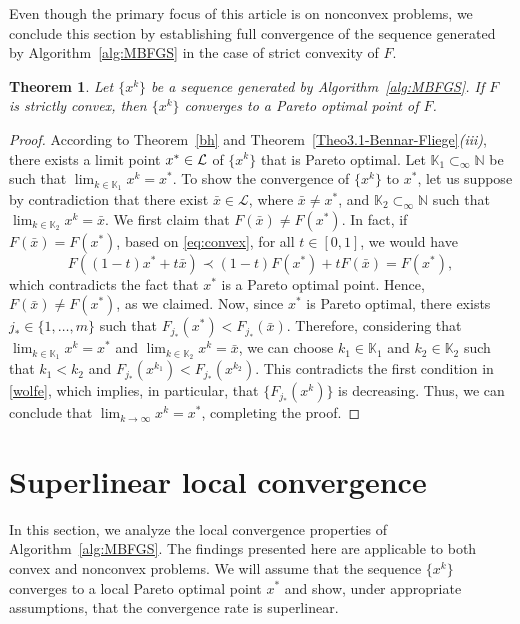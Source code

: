 \documentclass[11pt]{article}
\newtheorem{theorem}{Theorem}[section]
\numberwithin{assumption}{section}
\newcommand{\N}{\mathbb{N}}
\newcommand{\K}{\mathbb{K}}
\newcommand{\Ls}{{\cal{L}}}
\newcommand{\xs}{x^{\ast}}
\newcommand{\subsetinf}{\displaystyle\mathop{\subset}_{\infty}}
\begin{document}
Even though the primary focus of this article is on nonconvex problems, we conclude this section by establishing full convergence of the sequence generated by Algorithm~\ref{alg:MBFGS} in the case of strict convexity of $F$.

\begin{theorem}
Let $\{x^k\}$ be a sequence generated by Algorithm~\ref{alg:MBFGS}. If $F$ is strictly convex, then $\{x^k\}$ converges to a Pareto optimal point of $F$.
\end{theorem}
\begin{proof}
According to Theorem~\ref{bh} and Theorem~\ref{Theo3.1-Bennar-Fliege}{\it (iii)}, there exists a limit point $\xs\in\Ls$ of $\{x^k\}$ that is Pareto optimal.
Let $\K_1\subsetinf \N$ be such that  $\lim_{k\in \K_1}x^k=\xs$.
To show the convergence of $\{x^k\}$ to $\xs$, let us suppose by contradiction that there exist $\bar{x}\in\mathcal{L}$, where $\bar{x}\neq x^{\ast}$, and $\K_2\subsetinf \N$ such that $\lim_{k\in \K_2}x^k=\bar{x}$.
We first claim that $F(\bar{x})\neq F(x^{\ast})$. In fact, if $F(\bar{x})= F(x^{\ast})$, based on \eqref{eq:convex}, for all $t\in[0,1]$, we would have
\[F((1-t)x^{\ast}+t\bar{x})\prec (1-t)F(x^{\ast})+tF(\bar{x})=F(x^{\ast}),\]
which contradicts the fact that $x^{\ast}$ is a Pareto optimal point. Hence, $F(\bar{x})\neq F(x^{\ast})$, as we claimed.
Now, since $x^{\ast}$ is Pareto optimal, there exists $j_\ast\in\{1,\ldots,m\}$ such that $F_{j_\ast}(x^{\ast})<F_{j_\ast}(\bar{x})$. Therefore, considering that $\lim_{k\in \K_1}x^k=x^{\ast}$ and $\lim_{k\in \K_2}x^k=\bar{x}$, we can choose $k_1\in \K_1$ and $k_2\in \K_2$ such that $k_1<k_2$ and $F_{j_\ast}(x^{k_1})<F_{j_\ast}(x^{k_2})$. This contradicts the first condition in \eqref{wolfe}, which implies, in particular, that $\{F_{j_\ast}(x^k)\}$ is decreasing. Thus, we can conclude that $\lim_{k\to \infty}x^k=x^{\ast}$, completing the proof.
\end{proof}


\section{Superlinear local convergence} \label{sec:superlinear}

In this section, we analyze the local convergence properties of Algorithm~\ref{alg:MBFGS}. 
The findings presented here are applicable to both convex and nonconvex problems. 
We will assume that the sequence $\{x^k\}$ converges to a local Pareto optimal point $x^{\ast}$ and show, under appropriate assumptions, that the convergence rate is superlinear.
\end{document}
